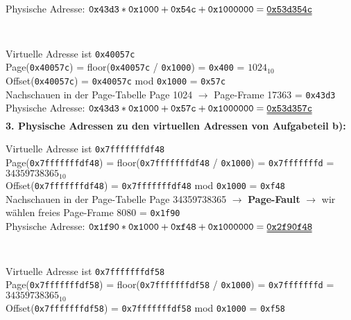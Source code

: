 \documentclass{ti2}
\begin{document}
Physische Adresse: $\texttt{0x43d3} * \texttt{0x1000} + \texttt{0x54c} + \texttt{0x1000000} = \uuline{\texttt{0x53d354c}}$\\
\\
\\

Virtuelle Adresse ist \texttt{0x40057c}\\

Page(\texttt{0x40057c}) = floor(\texttt{0x40057c} / \texttt{0x1000}) = \texttt{0x400} = $1024_{10}$\\
Offset(\texttt{0x40057c}) = \texttt{0x40057c} mod \texttt{0x1000} = \texttt{0x57c}\\

Nachschauen in der Page-Tabelle Page 1024 $\rightarrow$ Page-Frame 17363 = \texttt{0x43d3}\\

Physische Adresse: $\texttt{0x43d3} * \texttt{0x1000} + \texttt{0x57c} + \texttt{0x1000000} = \uuline{\texttt{0x53d357c}}$\\

\textbf{3. Physische Adressen zu den virtuellen Adressen von Aufgabeteil b):}

Virtuelle Adresse ist \texttt{0x7fffffffdf48}\\

Page(\texttt{0x7fffffffdf48}) = floor(\texttt{0x7fffffffdf48} / \texttt{0x1000}) = \texttt{0x7fffffffd} = $34359738365_{10}$\\
Offset(\texttt{0x7fffffffdf48}) = \texttt{0x7fffffffdf48} mod \texttt{0x1000} = \texttt{0xf48}\\

Nachschauen in der Page-Tabelle Page 34359738365 $\rightarrow$ \textbf{Page-Fault} $\rightarrow$ wir wählen freies Page-Frame 8080 = \texttt{0x1f90}\\

Physische Adresse: $\texttt{0x1f90} * \texttt{0x1000} + \texttt{0xf48} + \texttt{0x1000000} = \uuline{\texttt{0x2f90f48}}$\\
\\
\\

Virtuelle Adresse ist \texttt{0x7fffffffdf58}\\

Page(\texttt{0x7fffffffdf58}) = floor(\texttt{0x7fffffffdf58} / \texttt{0x1000}) = \texttt{0x7fffffffd} = $34359738365_{10}$\\
Offset(\texttt{0x7fffffffdf58}) = \texttt{0x7fffffffdf58} mod \texttt{0x1000} = \texttt{0xf58}\\
\end{document}
